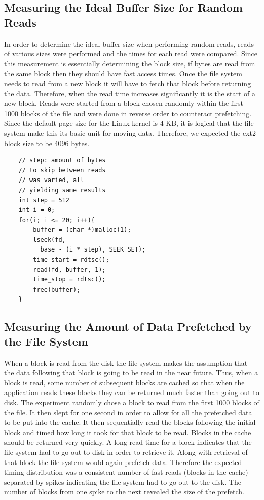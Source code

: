 \documentclass[letterpaper,twocolumn,10pt]{article}
\begin{document}
\subsection{Measuring the Ideal Buffer Size for Random Reads}

In order to determine the ideal buffer size when performing random reads, reads of various sizes were performed and the times for each read were compared. 
Since this measurement is essentially determining the block size, if bytes are read from the same block then they should have fast access times. 
Once the file system needs to read from a new block it will have to fetch that block before returning the data. 
Therefore, when the read time increases significantly it is the start of a new block.
Reads were started from a block chosen randomly within the first 1000 blocks of the file and were done in reverse order to counteract prefetching. 
Since the default page size for the Linux kernel is 4 KB, it is logical that the file system make this its basic unit for moving data. 
Therefore, we expected the ext2 block size to be 4096 bytes.

\begin{verbatim}
    // step: amount of bytes 
    // to skip between reads
    // was varied, all 
    // yielding same results
    int step = 512  
    int i = 0;
    for(i; i <= 20; i++){ 
        buffer = (char *)malloc(1);
        lseek(fd, 
          base - (i * step), SEEK_SET);
        time_start = rdtsc();
        read(fd, buffer, 1);
        time_stop = rdtsc();
        free(buffer);
    }
\end{verbatim} 

\subsection{Measuring the Amount of Data Prefetched by the File System}
When a block is read from the disk the file system makes the assumption that the data following that block is going to be read in the near future. 
Thus, when a block is read, some number of subsequent blocks are cached so that when the application reads these blocks they can be returned much faster than going out to disk. 
The experiment randomly chose a block to read from the first 1000 blocks of the file. 
It then slept for one second in order to allow for all the prefetched data to be put into the cache. 
It then sequentially read the blocks following the initial block and timed how long it took for that block to be read. 
Blocks in the cache should be returned very quickly. 
A long read time for a block indicates that the file system had to go out to disk in order to retrieve it. 
Along with retrieval of that block the file system would again prefetch data. 
Therefore the expected timing distribution was a consistent number of fast reads (blocks in the cache) separated by spikes indicating the file system had to go out to the disk. 
The number of blocks from one spike to the next revealed the size of the prefetch.
\end{document}
